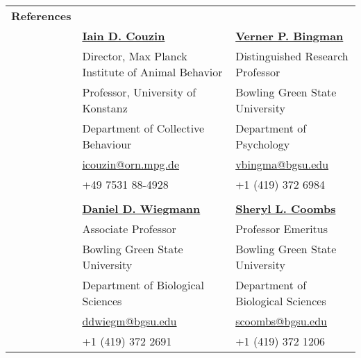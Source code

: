 \documentclass[letterpaper,7pt,oneside]{article}
\begin{document}
\noindent \begin{longtable}{@{} l l l}
 \Large{\textbf{References}} \vspace{5mm} \\
 & \href{http://www.collectivebehaviour.com/couzin}{\textbf{Iain D. Couzin}} & \href{https://www.bgsu.edu/arts-and-sciences/biological-sciences/faculty-and-staff/alphabetical-listing/verner-bingman.html}{\textbf{Verner P. Bingman}} \\
 & Director, Max Planck Institute of Animal Behavior &  Distinguished Research Professor  \\
 & Professor, University of Konstanz &  Bowling Green State University \\
 & Department of Collective Behaviour  & Department of Psychology \\
 & \small{\href{mailto:icouzin@orn.mpg.de}{icouzin@orn.mpg.de}} & \small{\href{mailto:vbingma@bgsu.edu}{vbingma@bgsu.edu}} \\
 &\small{+49 7531 88-4928} & \small{+1 (419) 372 6984} \\
&& \\
  & \href{https://www.bgsu.edu/arts-and-sciences/biological-sciences/faculty-and-staff/alphabetical-listing/daniel-wiegmann.html}{\textbf{Daniel D. Wiegmann}} & \href{https://www.bgsu.edu/arts-and-sciences/neuroscience/nmb-people/faculty/sheryl-coombs.html}{\textbf{Sheryl L. Coombs}} \\
 & Associate Professor  &  Professor Emeritus \\
 & Bowling Green State University & Bowling Green State University \\
 & Department of Biological Sciences  & Department of Biological Sciences \\
 & \small{\href{mailto:ddwiegm@bgsu.edu}{ddwiegm@bgsu.edu}} & \small{\href{mailto:scoombs@bgsu.edu}{scoombs@bgsu.edu}} \\
 &\small{+1 (419) 372 2691} & \small{+1 (419) 372 1206} \\
 
\end{longtable}


\end{document}
